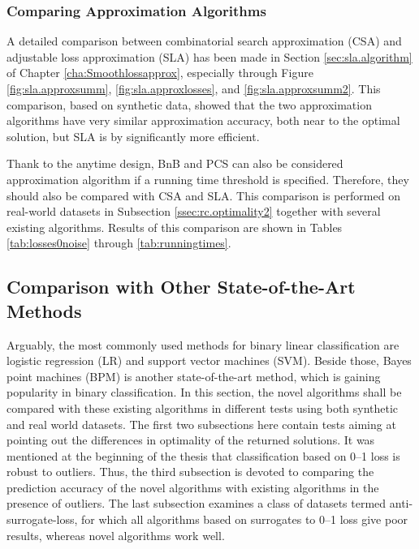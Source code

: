 \subsubsection{Comparing Approximation Algorithms}
\label{ssec:rc.approx}

A detailed comparison between combinatorial search approximation (CSA) and adjustable loss approximation (SLA) has been made in Section \ref{sec:sla.algorithm} of Chapter \ref{cha:Smoothlossapprox}, especially through Figure \ref{fig:sla.approxsumm}, \ref{fig:sla.approxlosses}, and \ref{fig:sla.approxsumm2}. This comparison,  based on synthetic data, showed that the two approximation algorithms have very similar approximation accuracy, both near to the optimal solution, but SLA is by significantly more efficient. 

Thank to the anytime design, BnB and PCS can also be considered approximation algorithm if a running time threshold is specified. Therefore, they should also be compared with CSA and SLA. This comparison is performed on real-world datasets in Subsection \ref{ssec:rc.optimality2} together with several existing algorithms. Results of this comparison are shown in Tables \ref{tab:losses0noise} through \ref{tab:runningtimes}.


\subsection{Comparison with Other State-of-the-Art Methods}
\label{sec:rc.others}

Arguably, the most commonly used methods for binary linear classification are logistic regression (LR) and support vector machines (SVM). Beside those, Bayes point machines (BPM) is another state-of-the-art method, which is gaining popularity in binary classification. In this section, the novel algorithms shall be compared with these existing algorithms in different tests using both synthetic and real world datasets. The first two subsections here contain tests aiming at pointing out the differences in optimality of the returned solutions. It was mentioned at the beginning of the thesis that classification based on 0--1 loss is robust to outliers. Thus, the third subsection is devoted to comparing the prediction accuracy of the novel algorithms with existing algorithms in the presence of outliers. The last subsection examines a class of datasets termed anti-surrogate-loss, for which all algorithms based on surrogates to 0--1 loss give poor results, whereas novel algorithms work well. 


